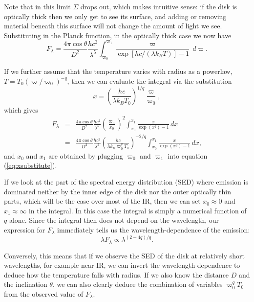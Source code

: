 Note that in this limit $\Sigma$ drops out, which makes intuitive sense: if the disk is optically thick then we only get to see its surface, and adding or removing material beneath this surface will not change the amount of light we see. Substituting in the Planck function, in the optically thick case we now have
\begin{equation}
F_{\lambda} = \frac{4\pi\cos\theta}{D^2} \frac{hc^2}{\lambda^5} \int_{\varpi_0}^{\varpi_1} \frac{\varpi}{\exp[hc/(\lambda k_B T)]-1}\,d\varpi.
\end{equation}

If we further assume that the temperature varies with radius as a powerlaw, $T=T_0(\varpi/\varpi_0)^{-q}$, then we can evaluate the integral via the substitution
\begin{equation}
\label{eq:xsubstitute}
x=\left(\frac{hc}{\lambda k_B T_0}\right)^{1/q} \frac{\varpi}{\varpi_0},
\end{equation}
which gives
\begin{eqnarray}
F_{\lambda} & = & 
\frac{4\pi \cos\theta}{D^2} \frac{hc^2}{\lambda^5} \left(\frac{\varpi_0}{x_0}\right)^2 \int_{x_0}^{x_1} \frac{x}{\exp(x^q)-1}\,dx \\
& = & 
\frac{4\pi \cos\theta}{D^2} \frac{hc^2}{\lambda^5} \left(\frac{hc}{\lambda k_B \varpi_0^q T_0}\right)^{-2/q} \int_{x_0}^{x_1} \frac{x}{\exp(x^q)-1}\,dx,
\end{eqnarray}
and $x_0$ and $x_1$ are obtained by plugging $\varpi_0$ and $\varpi_1$ into equation (\ref{eq:xsubstitute}).

If we look at the part of the spectral energy distribution (SED) where emission is dominated neither by the inner edge of the disk nor the outer optically thin parts, which will be the case over most of the IR, then we can set $x_0\approx 0$ and $x_1\approx \infty$ in the integral. In this case the integral is simply a numerical function of $q$ alone. Since the integral then does not depend on the wavelength, our expression for $F_{\lambda}$ immediately tells us the wavelength-dependence of the emission:
\begin{equation}
\lambda F_{\lambda} \propto \lambda^{(2-4q)/q}.
\end{equation}

Conversely, this means that if we observe the SED of the disk at relatively short wavelengths, for example near-IR, we can invert the wavelength dependence to deduce how the temperature falls with radius. If we also know the distance $D$ and the inclination $\theta$, we can also clearly deduce the combination of variables $\varpi_0^q T_0$ from the observed value of $F_\lambda$.

